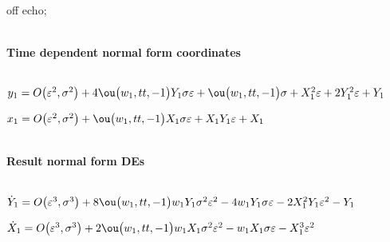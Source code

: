 \documentclass[11pt,a5paper]{article}
\begin{document}


off echo;


\(\)
\paragraph{Time dependent normal form coordinates}
\(
\)\par

\(y_{1}=O\big(\varepsilon ^{2},\sigma^{2}\big)+4 \ou\big(w_{1},tt,-1\big) 
Y_{1} \sigma  \eps+\ou\big(w_{1},tt,-1\big) \sigma +X_{1}^{2} \eps+2 Y_{
1}^{2} \eps+Y_{1}
\)\par

\(x_{1}=O\big(\varepsilon ^{2},\sigma^{2}\big)+\ou\big(w_{1},tt,-1\big) X_
{1} \sigma  \eps+X_{1} Y_{1} \eps+X_{1}
\)\par

\(\)
\paragraph{Result normal form DEs}
\(
\)\par

\(\dot Y_{1}=O\big(\varepsilon ^{3},\sigma^{3}\big)+8 \ou\big(w_{1},tt,-1
\big) w_{1} Y_{1} \sigma ^{2} \eps^{2}-4 w_{1} Y_{1} \sigma  \eps-2 X_{1
}^{2} Y_{1} \eps^{2}-Y_{1}
\)\par

\(\dot X_{1}=O\big(\varepsilon ^{3},\sigma^{3}\big)+2 \ou\big(w_{1},tt,-1
\big) w_{1} X_{1} \sigma ^{2} \eps^{2}-w_{1} X_{1} \sigma  \eps-X_{1}^{3
} \eps^{2}
\)\par
\end{document}
